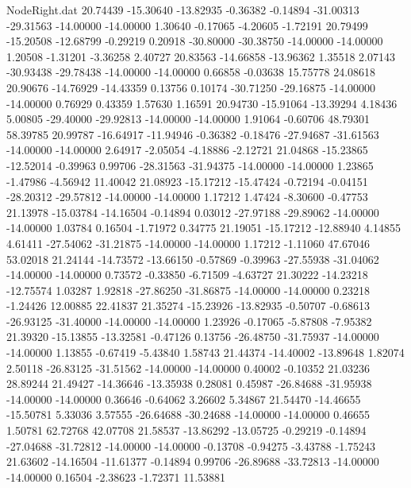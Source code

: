 \begin{filecontents}{NodeRight.dat}
  20.74439  -15.30640  -13.82935    -0.36382   -0.14894  -31.00313  -29.31563  -14.00000  -14.00000    1.30640   -0.17065   -4.20605   -1.72191
  20.79499  -15.20508  -12.68799    -0.29219    0.20918  -30.80000  -30.38750  -14.00000  -14.00000    1.20508   -1.31201   -3.36258    2.40727
  20.83563  -14.66858  -13.96362     1.35518    2.07143  -30.93438  -29.78438  -14.00000  -14.00000    0.66858   -0.03638   15.75778   24.08618
  20.90676  -14.76929  -14.43359     0.13756    0.10174  -30.71250  -29.16875  -14.00000  -14.00000    0.76929    0.43359    1.57630    1.16591
  20.94730  -15.91064  -13.39294     4.18436    5.00805  -29.40000  -29.92813  -14.00000  -14.00000    1.91064   -0.60706   48.79301   58.39785
  20.99787  -16.64917  -11.94946    -0.36382   -0.18476  -27.94687  -31.61563  -14.00000  -14.00000    2.64917   -2.05054   -4.18886   -2.12721
  21.04868  -15.23865  -12.52014    -0.39963    0.99706  -28.31563  -31.94375  -14.00000  -14.00000    1.23865   -1.47986   -4.56942   11.40042
  21.08923  -15.17212  -15.47424    -0.72194   -0.04151  -28.20312  -29.57812  -14.00000  -14.00000    1.17212    1.47424   -8.30600   -0.47753
  21.13978  -15.03784  -14.16504    -0.14894    0.03012  -27.97188  -29.89062  -14.00000  -14.00000    1.03784    0.16504   -1.71972    0.34775
  21.19051  -15.17212  -12.88940     4.14855    4.61411  -27.54062  -31.21875  -14.00000  -14.00000    1.17212   -1.11060   47.67046   53.02018
  21.24144  -14.73572  -13.66150    -0.57869   -0.39963  -27.55938  -31.04062  -14.00000  -14.00000    0.73572   -0.33850   -6.71509   -4.63727
  21.30222  -14.23218  -12.75574     1.03287    1.92818  -27.86250  -31.86875  -14.00000  -14.00000    0.23218   -1.24426   12.00885   22.41837
  21.35274  -15.23926  -13.82935    -0.50707   -0.68613  -26.93125  -31.40000  -14.00000  -14.00000    1.23926   -0.17065   -5.87808   -7.95382
  21.39320  -15.13855  -13.32581    -0.47126    0.13756  -26.48750  -31.75937  -14.00000  -14.00000    1.13855   -0.67419   -5.43840    1.58743
  21.44374  -14.40002  -13.89648     1.82074    2.50118  -26.83125  -31.51562  -14.00000  -14.00000    0.40002   -0.10352   21.03236   28.89244
  21.49427  -14.36646  -13.35938     0.28081    0.45987  -26.84688  -31.95938  -14.00000  -14.00000    0.36646   -0.64062    3.26602    5.34867
  21.54470  -14.46655  -15.50781     5.33036    3.57555  -26.64688  -30.24688  -14.00000  -14.00000    0.46655    1.50781   62.72768   42.07708
  21.58537  -13.86292  -13.05725    -0.29219   -0.14894  -27.04688  -31.72812  -14.00000  -14.00000   -0.13708   -0.94275   -3.43788   -1.75243
  21.63602  -14.16504  -11.61377    -0.14894    0.99706  -26.89688  -33.72813  -14.00000  -14.00000    0.16504   -2.38623   -1.72371   11.53881

\end{filecontents}
